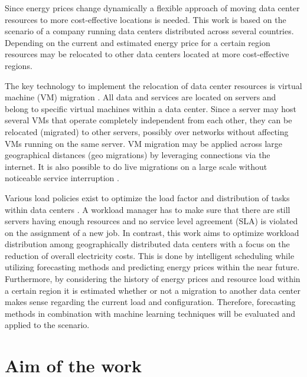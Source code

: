 Since energy prices change dynamically a flexible approach of moving data center resources to more cost-effective locations is needed. This work is based on the scenario of a company running data centers distributed across several countries. Depending on the current and estimated energy price for a certain region resources may be relocated to other data centers located at more cost-effective regions.

The key technology to implement the relocation of data center resources is virtual machine (VM) migration \cite{nelson2009virtual}. All data and services are located on servers and belong to specific virtual machines within a data center. Since a server may host several VMs that operate completely independent from each other, they can be relocated (migrated) to other servers, possibly over networks without affecting VMs running on the same server. VM migration may be applied across large geographical distances (geo migrations) by leveraging connections via the internet. It is also possible to do live migrations on a large scale without noticeable service interruption \cite{celesti2010improving}. 

Various load policies exist to optimize the load factor and distribution of tasks within data centers \cite{buyya2010energy}. A workload manager has to make sure that there are still servers having enough resources and no service level agreement (SLA) is violated on the assignment of a new job. 
In contrast, this work aims to optimize workload distribution among geographically distributed data centers with a focus on the reduction of overall electricity costs. This is done by intelligent scheduling while utilizing forecasting methods and predicting energy prices within the near future. 
Furthermore, by considering the history of energy prices and resource load within a certain region it is estimated whether or not a migration to another data center makes sense regarding the current load and configuration. Therefore, forecasting methods in combination with machine learning techniques will be evaluated and applied to the scenario. 

\section{Aim of the work}

